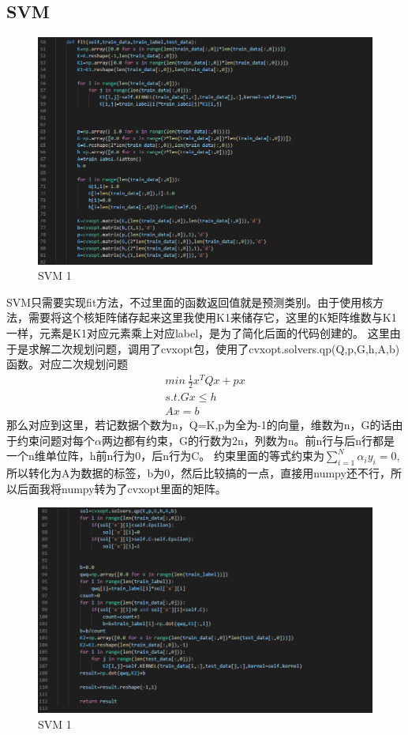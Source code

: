 \documentclass{report}
\begin{document}
    \subsection{SVM}
    \begin{figure}[H]
        \centering
        \includegraphics[width=15cm]{5.png}
        \caption{SVM 1}
    \end{figure}
    SVM只需要实现fit方法，不过里面的函数返回值就是预测类别。由于使用核方法，需要将这个核矩阵储存起来这里我使用K1来储存它，这里的K矩阵维数与K1一样，元素是K1对应元素乘上对应label，是为了简化后面的代码创建的。
    这里由于是求解二次规划问题，调用了cvxopt包，使用了cvxopt.solvers.qp(Q,p,G,h,A,b)函数。对应二次规划问题
    \begin{gather}
        min\  \frac{1}{2}x^TQx+px\\
        s.t. Gx \leq h \\
            Ax=b
    \end{gather}
    那么对应到这里，若记数据个数为n，Q=K,p为全为-1的向量，维数为n，G的话由于约束问题对每个$\alpha$两边都有约束，G的行数为2n，列数为n。前n行与后n行都是一个n维单位阵，h前n行为0，后n行为C。
    约束里面的等式约束为$\sum_{i=1}^{N}\alpha_iy_i=0$,所以转化为A为数据的标签，b为0，然后比较搞的一点，直接用numpy还不行，所以后面我将numpy转为了cvxopt里面的矩阵。
    \begin{figure}[H]
        \centering
        \includegraphics[width=15cm]{6.png}
        \caption{SVM 1}
    \end{figure}
\end{document}
